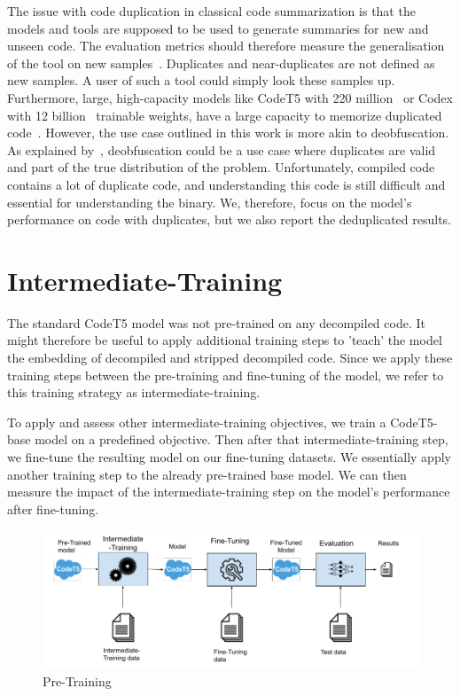 The issue with code duplication in classical code summarization is that the models and tools are supposed to be used to generate summaries for new and unseen code. The evaluation metrics should therefore measure the generalisation of the tool on new samples~\cite{allamanis_adverse}. Duplicates and near-duplicates are not defined as new samples. A user of such a tool could simply look these samples up. Furthermore, large, high-capacity models like CodeT5 with 220 million~\cite{CodeT5} or Codex with 12 billion~\cite{CodeX} trainable weights, have a large capacity to memorize duplicated code~\cite{allamanis_adverse}.
However, the use case outlined in this work is more akin to deobfuscation. As explained by~\citeauthor{allamanis_adverse}, deobfuscation could be a use case where duplicates are valid and part of the true distribution of the problem\cite{allamanis_adverse}. Unfortunately, compiled code contains a lot of duplicate code, and understanding this code is still difficult and essential for understanding the binary. We, therefore, focus on the model's performance on code with duplicates, but we also report the deduplicated results.

\section{Intermediate-Training}
The standard CodeT5 model was not pre-trained on any decompiled code. It might therefore be useful to apply additional training steps to 'teach' the model the embedding of decompiled and stripped decompiled code. Since we apply these training steps between the pre-training and fine-tuning of the model, we refer to this training strategy as intermediate-training.

To apply and assess other intermediate-training objectives, we train a CodeT5-base model on a predefined objective. Then after that intermediate-training step, we fine-tune the resulting model on our fine-tuning datasets. We essentially apply another training step to the already pre-trained base model. We can then measure the impact of the intermediate-training step on the model's performance after fine-tuning.

\begin{figure}[H]
  \centering
  \includegraphics[width=\linewidth]{img/pre-training.png}
  \caption{Pre-Training}
  \label{fig:preTraining}
\end{figure}

